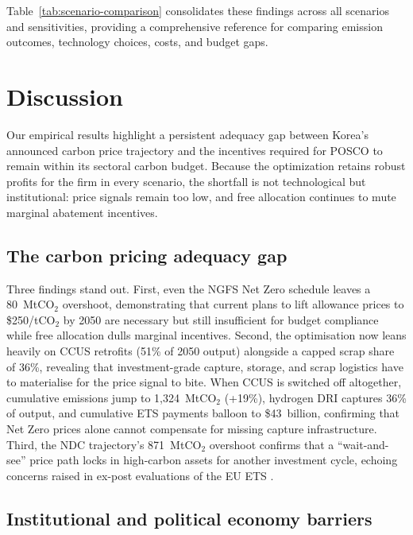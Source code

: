 \documentclass[preprint,1p,authoryear]{elsarticle}
\begin{document}
Table~\ref{tab:scenario-comparison} consolidates these findings across all scenarios and sensitivities, providing a comprehensive reference for comparing emission outcomes, technology choices, costs, and budget gaps.

\section{Discussion}

Our empirical results highlight a persistent adequacy gap between Korea's announced carbon price trajectory and the incentives required for POSCO to remain within its sectoral carbon budget. Because the optimization retains robust profits for the firm in every scenario, the shortfall is not technological but institutional: price signals remain too low, and free allocation continues to mute marginal abatement incentives.

\subsection{The carbon pricing adequacy gap}

Three findings stand out. First, even the NGFS Net Zero schedule leaves a 80~MtCO$_2$ overshoot, demonstrating that current plans to lift allowance prices to \$250/tCO$_2$ by 2050 are necessary but still insufficient for budget compliance while free allocation dulls marginal incentives. Second, the optimisation now leans heavily on CCUS retrofits (51\% of 2050 output) alongside a capped scrap share of 36\%, revealing that investment-grade capture, storage, and scrap logistics have to materialise for the price signal to bite. When CCUS is switched off altogether, cumulative emissions jump to 1,324~MtCO$_2$ (+19\%), hydrogen DRI captures 36\% of output, and cumulative ETS payments balloon to \$43~billion, confirming that Net Zero prices alone cannot compensate for missing capture infrastructure. Third, the NDC trajectory's 871~MtCO$_2$ overshoot confirms that a “wait-and-see” price path locks in high-carbon assets for another investment cycle, echoing concerns raised in ex-post evaluations of the EU ETS \citep{Green2021, martin2016industry}.

\subsection{Institutional and political economy barriers}
\end{document}
